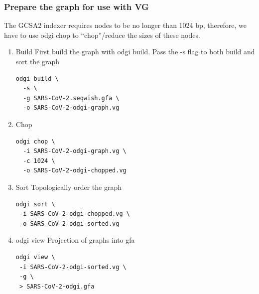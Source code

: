 \documentclass[a4paper]{article}
\begin{document}
\subsubsection{Prepare the graph for use with VG}
\label{sec:orgd6b999d}
The GCSA2 indexer requires nodes to be no longer than 1024 bp, therefore, we have to use odgi chop to “chop”/reduce the sizes of these nodes.
\begin{enumerate}
\item Build
\label{sec:orga81f2d9}
First build the graph with odgi build. Pass the -s flag to both build and sort the graph

\begin{verbatim}
odgi build \
  -s \
  -g SARS-CoV-2.seqwish.gfa \
  -o SARS-CoV-2-odgi-graph.vg
\end{verbatim}

\item Chop
\label{sec:orgaeb58c3}

\begin{verbatim}
odgi chop \
  -i SARS-CoV-2-odgi-graph.vg \
  -c 1024 \
  -o SARS-CoV-2-odgi-chopped.vg
\end{verbatim}

\item Sort
\label{sec:orga07dbef}
Topologically order the graph

\begin{verbatim}
odgi sort \
 -i SARS-CoV-2-odgi-chopped.vg \
 -o SARS-CoV-2-odgi-sorted.vg
\end{verbatim}

\item odgi view
\label{sec:org542bfa9}
Projection of graphs into gfa

\begin{verbatim}
odgi view \
 -i SARS-CoV-2-odgi-sorted.vg \
 -g \
 > SARS-CoV-2-odgi.gfa
\end{verbatim}
\end{enumerate}
\end{document}
